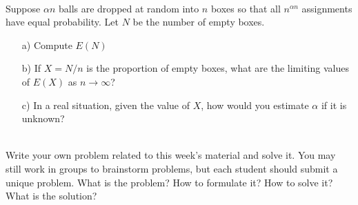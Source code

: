 \documentclass[]{article}
\newif\ifsolutions
\renewcommand{\answer}[1]{{\color{mydarkblue}\textbf{Solution:}#1}}
\begin{document}
\begin{qunlist}
\ifsolutions{ \answer{
Using the notation in the extremely helpful hint, $E[T]=E[T\,|\, A]\Pr[A]+E[T\,|\, S]\Pr[S]+E[T\,|\, D]\Pr[D]=\frac{1}{3}(E[T\,|\, A]+E[T\,|\, S]+E[T\,|\, D])$.
Note that $E[T\,|\, A]=E[T]+2$ by the memorylessness of the situation.
Similarly, $E[T\,|\, S]=E[T]+5$. Lastly, $E[T\,|\, D]=0$ because
Mr. Bond escapes immediately. So we have that $E[T]=\frac{1}{3}(E[T]+2+E[T]+5+0)$.
Solving this for $E[T]$, we get that $E[T]=\fbox{\ensuremath{\mathbf{007}}}$.
}}
\fi

\\
Suppose $\alpha n$ balls are dropped at random into $n$ boxes so that all $n^{\alpha n}$ assignments have equal probability. Let $N$ be the number of empty boxes.
\begin{itemize}
\item[a)] Compute $E(N)$
\item[b)] If $X=N/n$ is the proportion of empty boxes, what are the limiting values of $E(X)$ as $n \rightarrow \infty$?
\item[c)] In a real situation, given the value of $X$, how would you estimate $\alpha$ if it is unknown?
\end{itemize}



\ifsolutions{ \answer{
\begin{itemize}
\item[a)] $Y_i=1$ if box $i$ is empty, 0 otherwise;
\[
E(N)=E(\sum_{i=1}^n Y_i)=\sum_{i=1}^n E(Y_i)=\sum_{i=1}^n P(Y_i=1)
=\sum_{i=1}^n (\frac{(n-1)^{\alpha n}}{n^{\alpha n}}) = n(1-\frac{1}{n})^{\alpha n}
\]
\item[b)] Using the fact that 
\[
\lim_{n\rightarrow \infty}(1-\frac{1}{n})^{\alpha n} = e^{\alpha}
\]

\[
E(X)=E(\frac{N}{n})=\frac{E(N)}{n}=(1-\frac{1}{n})^{\alpha n}
\]

\[\lim_{n \rightarrow \infty}E(X) = e^{\alpha} \]

\item[c)]
If $n$ is large and we know $X_n$, then our estimate of $\alpha$ would be $\hat{\alpha}=logX_n$


\end{itemize}
}}
\fi

 \\
Write your own problem related to this week's material and solve it. You may still work in groups to brainstorm problems, but each student should submit a unique problem. What is the problem? How to formulate it? How to solve it? What is the solution?


\end{qunlist}
\end{document}
